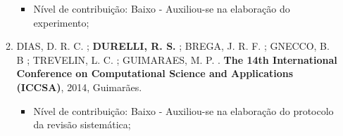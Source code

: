 \begin{itemize}
\begin{enumerate}
		    \begin{itemize}
			        \item Nível de contribuição: Baixo - Auxiliou-se na elaboração do experimento;
			    \end{itemize}
		
		\item DIAS, D. R. C. ; \textbf{DURELLI, R. S.} ; BREGA, J. R. F. ; GNECCO, B. B ; TREVELIN, L. C. ; GUIMARAES, M. P. . \textbf{The 14th International Conference on Computational Science and Applications (ICCSA)}, 2014, Guimarães.
		
		    \begin{itemize}
			        \item Nível de contribuição: Baixo - Auxiliou-se na elaboração do protocolo da revisão sistemática;
			    \end{itemize}

\end{enumerate}
\end{itemize}